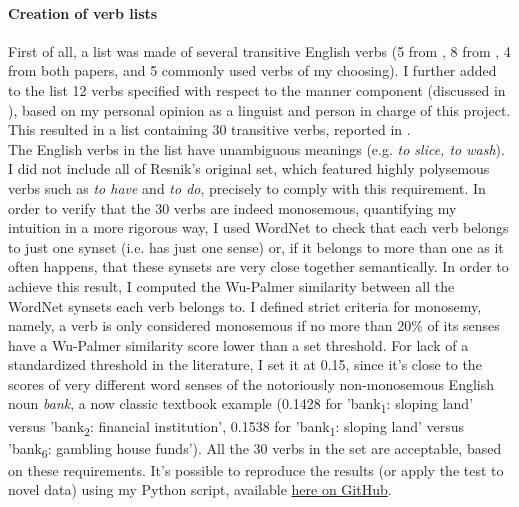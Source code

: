 \paragraph{Creation of verb lists} First of all, a list was made of several transitive English verbs (5 from \textcite{Resnik1993}, 8 from \textcite{Levin1993}, 4 from both papers, and 5 commonly used verbs of my choosing). I further added to the list 12 verbs specified with respect to the manner component (discussed in ), based on my personal opinion as a linguist and person in charge of this project. This resulted in a list containing 30 transitive verbs, reported in .\\
The English verbs in the list have unambiguous meanings (e.g. \textit{to slice, to wash}). I did not include all of Resnik's original set, which featured highly polysemous verbs such as \textit{to have} and \textit{to do}, precisely to comply with this requirement. In order to verify that the 30 verbs are indeed monosemous, quantifying my intuition in a more rigorous way, I used WordNet \parencite{Miller1995} to check that each verb belongs to just one synset (i.e. has just one sense) or, if it belongs to more than one as it often happens, that these synsets are very close together semantically. In order to achieve this result, I computed the Wu-Palmer similarity between all the WordNet synsets each verb belongs to. I defined strict criteria for monosemy, namely, a verb is only considered monosemous if no more than 20\% of its senses have a Wu-Palmer similarity score lower than a set threshold. For lack of a standardized threshold in the literature, I set it at 0.15, since it's close to the scores of very different word senses of the notoriously non-monosemous English noun \textit{bank}, a now classic textbook example (0.1428 for 'bank\textsubscript{1}: sloping land' versus 'bank\textsubscript{2}: financial institution', 0.1538 for 'bank\textsubscript{1}: sloping land' versus 'bank\textsubscript{6}: gambling house funds'). All the 30 verbs in the set are acceptable, based on these requirements. It's possible to reproduce the results (or apply the test to novel data) using my Python script, available \href{https://github.com/giuliacappelli/checkPolysemy}{here on GitHub}.\\
